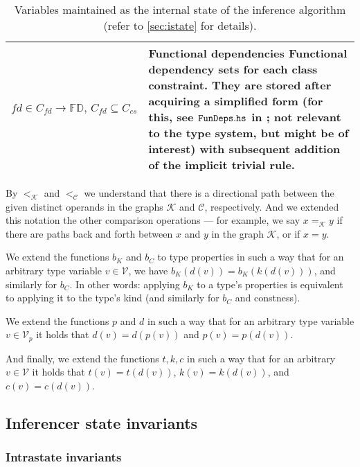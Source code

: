 \begin{table}
\begin{tabular}{p{.23\linewidth}p{.7\linewidth}}
  $fd \in C_{fd} \to \mathbb{FD},\,C_{fd} \subseteq C_{cs}$ & \textbf{Functional dependencies}\quad
  Functional dependency sets for each class constraint. They are stored after acquiring a simplified form (for this, see $\mathtt{FunDeps.hs}$ in \cite{klepl2022compiler}; not relevant to the type system, but might be of interest) with subsequent addition of the implicit trivial rule. \\
\bottomrule
\end{tabular}
\caption{Variables maintained as the internal state of the inference algorithm (refer to \cref{sec:istate} for details).}
\label{tab:istate}
\end{table}

By $<_{\mathcal{K}}$ and $<_{\mathcal{C}}$ we understand that there is a directional path between the given distinct operands in the graphs $\mathcal{K}$ and $\mathcal{C}$, respectively. And we extended this notation the other comparison operations --- for example, we say $x =_{\mathcal{K}} y$ if there are paths back and forth between $x$ and $y$ in the graph $\mathcal{K}$, or if $x = y$.


\begin{defn}
    We extend the functions $b_K$ and $b_C$ to type properties in such a way that for an arbitrary type variable $v \in \mathcal{V}$, we have $b_K (d (v)) = b_K (k (d (v)))$, and similarly for $b_C$. In other words: applying $b_K$ to a type's properties is equivalent to applying it to the type's kind (and similarly for $b_C$ and constness).

    We extend the functions $p$ and $d$ in such a way that for an arbitrary type variable $v \in \mathcal{V}_p$ it holds that $d(v) = d(p(v))$ and $p(v) = p(d(v))$.

    And finally, we extend the functions $t, k, c$ in such a way that for an arbitrary $v \in \mathcal{V}$ it holds that $t (v) = t (d (v))$, $k (v) = k (d (v))$, and $c (v) = c (d (v))$.
\end{defn}

\subsection{Inferencer state invariants}
\label{sec:invariants}

\subsubsection{Intrastate invariants}

